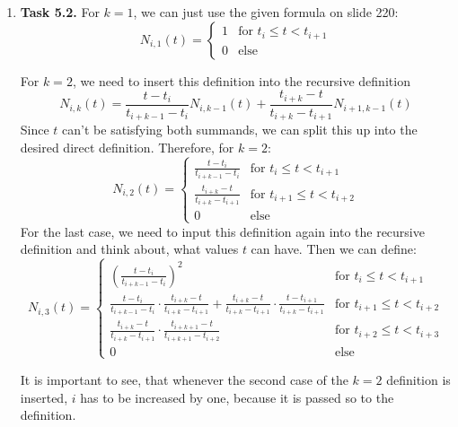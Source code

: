 \documentclass[a4paper,11pt]{article}
\begin{document}
\begin {enumerate}
		We wrote the following code:
		
		
		
	\item[\textbf{Task 5.2.}]
		For $k = 1$, we can just use the given formula on slide 220:
		$$N_{i,1}(t) = \begin{cases}
			1 & \text{for } t_{i} \leq t < t_{i+1}\\
			0 & \text{else}
		\end{cases}$$
		
		For $k = 2$, we need to insert this definition into the recursive definition
		$$N_{i,k}(t) = \frac{t-t_i}{t_{i+k-1}-t_i} N_{i, k-1}(t) + \frac{t_{i+k}-t}{t_{i+k}-t_{i+1}} N_{i+1, k-1}(t)$$
		Since $t$ can't be satisfying both summands, we can split this up into the desired direct definition. Therefore, for $k = 2$:
		$$N_{i,2}(t) = \begin{cases}
			\frac{t-t_i}{t_{i+k-1}-t_i} & \text{for } t_{i} \leq t < t_{i+1}\\
			\frac{t_{i+k}-t}{t_{i+k}-t_{i+1}} & \text{for } t_{i+1} \leq t < t_{i+2}\\
			0 & \text{else}
		\end{cases}$$
		For the last case, we need to input this definition again into the recursive definition and think about, what values $t$ can have. Then we can define:
		$$N_{i,3}(t) = \begin{cases}
			\left( \frac{t-t_i}{t_{i+k-1}-t_i} \right)^2 & \text{for } t_{i} \leq t < t_{i+1}\\
			\frac{t-t_i}{t_{i+k-1}-t_i} \cdot \frac{t_{i+k}-t}{t_{i+k}-t_{i+1}} + \frac{t_{i+k}-t}{t_{i+k}-t_{i+1}} \cdot \frac{t-t_{i+1}}{t_{i+k}-t_{i+1}} & \text{for } t_{i+1} \leq t < t_{i+2}\\
			\frac{t_{i+k}-t}{t_{i+k}-t_{i+1}} \cdot \frac{t_{i+k+1}-t}{t_{i+k+1}-t_{i+2}} & \text{for } t_{i+2} \leq t < t_{i+3}\\
			0 & \text{else}
		\end{cases}$$
		
		It is important to see, that whenever the second case of the $k = 2$ definition is inserted, $i$ has to be increased by one, because it is passed so to the definition.
		

\end{enumerate}
\end{document}
